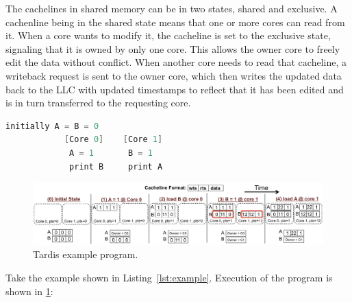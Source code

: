 \documentclass[12pt]{article}
\begin{document}
The cachelines in shared memory can be in two states, shared and exclusive. A cachenline being in the shared state means that one or more cores can read from it. When a core wants to modify it, the cacheline is set to the exclusive state, signaling that it is owned by only one core. This allows the owner core to freely edit the data without conflict. When another core needs to read that cacheline, a writeback request is sent to the owner core, which then writes the updated data back to the LLC with updated timestamps to reflect that it has been edited and is in turn transferred to the requesting core.


\vspace{50mm}



\vspace{-.1in}
\begin{lstlisting}[language=C,label={lst:example},caption={Example 
Program}]
			  initially A = B = 0
			[Core 0]	[Core 1]
			 A = 1		 B = 1
			 print B	 print A
\end{lstlisting}


\begin{figure}
	\centering
	\includegraphics[width=0.95\columnwidth]{figs/example.pdf}
	\caption{ Tardis example program.}
	\label{fig:example}
\end{figure}


Take the example shown in Listing~\ref{lst:example}. Execution of the program is shown in \cref{fig:example}:
\end{document}
